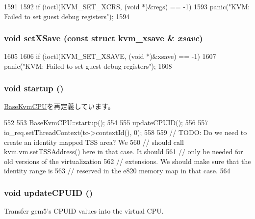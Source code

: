 \begin{DoxyCode}
1591 {
1592     if (ioctl(KVM_SET_XCRS, (void *)&regs) == -1)
1593         panic("KVM: Failed to set guest debug registers\n");
1594 }
\end{DoxyCode}
\hypertarget{classX86KvmCPU_aa05e7c39fbe7374815b387728b7de06d}{
\subsubsection[{setXSave}]{\setlength{\rightskip}{0pt plus 5cm}void setXSave (const struct kvm\_\-xsave \& {\em xsave})}}
\label{classX86KvmCPU_aa05e7c39fbe7374815b387728b7de06d}



\begin{DoxyCode}
1605 {
1606     if (ioctl(KVM_SET_XSAVE, (void *)&xsave) == -1)
1607         panic("KVM: Failed to set guest debug registers\n");
1608 }
\end{DoxyCode}
\hypertarget{classX86KvmCPU_aecc7d8debf54990ffeaaed5bac7d7d81}{
\subsubsection[{startup}]{\setlength{\rightskip}{0pt plus 5cm}void startup ()}}
\label{classX86KvmCPU_aecc7d8debf54990ffeaaed5bac7d7d81}


\hyperlink{classBaseKvmCPU_aecc7d8debf54990ffeaaed5bac7d7d81}{BaseKvmCPU}を再定義しています。


\begin{DoxyCode}
552 {
553     BaseKvmCPU::startup();
554 
555     updateCPUID();
556 
557     io_req.setThreadContext(tc->contextId(), 0);
558 
559     // TODO: Do we need to create an identity mapped TSS area? We
560     // should call kvm.vm.setTSSAddress() here in that case. It should
561     // only be needed for old versions of the virtualization
562     // extensions. We should make sure that the identity range is
563     // reserved in the e820 memory map in that case.
564 }
\end{DoxyCode}
\hypertarget{classX86KvmCPU_adcec996536ccdb020b08a11d61a47d44}{
\subsubsection[{updateCPUID}]{\setlength{\rightskip}{0pt plus 5cm}void updateCPUID ()}}
\label{classX86KvmCPU_adcec996536ccdb020b08a11d61a47d44}
Transfer gem5's CPUID values into the virtual CPU. 


